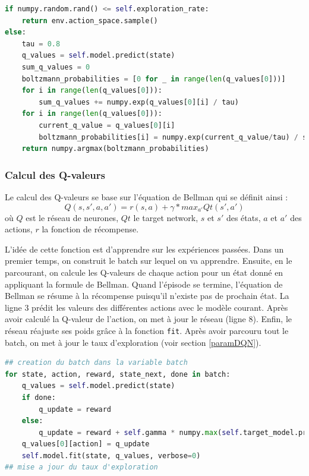 \documentclass[10pt,a4paper]{article}
\begin{document}
\begin{lstlisting}[language=Python,caption=Politique de Boltzmann]          
if numpy.random.rand() <= self.exploration_rate:
    return env.action_space.sample()
else:
    tau = 0.8
    q_values = self.model.predict(state)
    sum_q_values = 0
    boltzmann_probabilities = [0 for _ in range(len(q_values[0]))]
    for i in range(len(q_values[0])):
        sum_q_values += numpy.exp(q_values[0][i] / tau)
    for i in range(len(q_values[0])):
        current_q_value = q_values[0][i]
        boltzmann_probabilities[i] = numpy.exp(current_q_value/tau) / sum_q_values
    return numpy.argmax(boltzmann_probabilities)
\end{lstlisting}

\subsubsection{Calcul des Q-valeurs} \label{qvalDQN}
Le calcul des Q-valeurs se base sur l'équation de Bellman qui se définit ainsi :
$$Q(s,s',a,a') = r(s,a) + \gamma * max_{a'}Qt(s', a')$$ où $Q$ est le réseau de neurones, $Qt$ le target network, $s$ et $s'$ des états, $a$ et $a'$ des actions, $r$ la fonction de récompense. 

L'idée de cette fonction est d'apprendre sur les expériences passées. Dans un premier temps, on construit le batch sur lequel on va apprendre. Ensuite, en le parcourant, on calcule les Q-valeurs de chaque action pour un état donné en appliquant la formule de Bellman. Quand l'épisode se termine, l'équation de Bellman se résume à la récompense puisqu'il n'existe pas de prochain état. La ligne 3 prédit les valeurs des différentes actions avec le modèle courant. Après avoir calculé la Q-valeur de l'action, on met à jour le réseau (ligne 8). Enfin, le réseau réajuste ses poids grâce à la fonction \lstinline{fit}. Après avoir parcouru tout le batch, on met à jour le taux d'exploration (voir section \ref{paramDQN}).

\begin{lstlisting}[language=Python, caption=Expérience repaly de l'agent DQN]
## creation du batch dans la variable batch
for state, action, reward, state_next, done in batch:
	q_values = self.model.predict(state)
	if done:
		q_update = reward
	else:
		q_update = reward + self.gamma * numpy.max(self.target_model.predict(next_state)[0])
	q_values[0][action] = q_update
	self.model.fit(state, q_values, verbose=0)
## mise a jour du taux d'exploration
\end{lstlisting}
\end{document}

